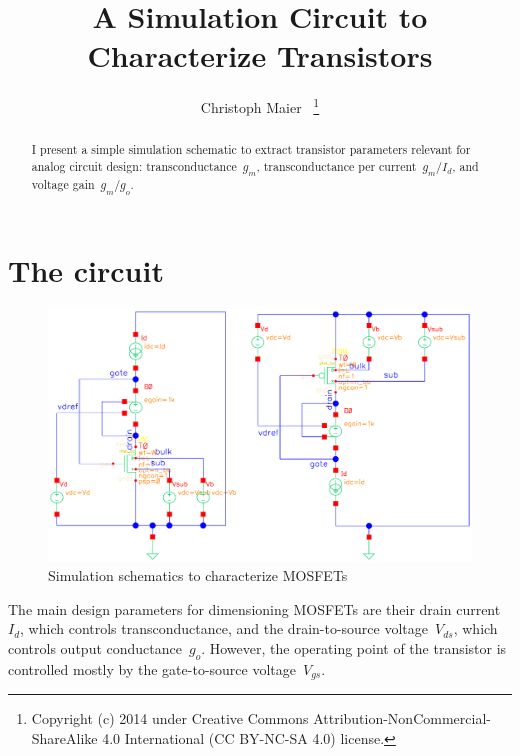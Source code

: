 \documentclass[journal]{IEEEtran}
\begin{document}
\title{A Simulation Circuit to Characterize Transistors}
\author{Christoph Maier~%
\thanks{Copyright (c) 2014 under Creative Commons
Attribution-NonCommercial-ShareAlike 4.0 International (CC BY-NC-SA 4.0) license.}}%
\maketitle
\begin{abstract}\boldmath
I present a simple simulation schematic to extract transistor parameters relevant for analog circuit design:
transconductance~$g_m$, transconductance per current~$g_m/I_d$, and voltage gain~$g_m/g_o$.
\end{abstract}



\IEEEpeerreviewmaketitle
\section{The circuit}
\begin{figure}[h]
\centering
\includegraphics[width=1.0\columnwidth]{figures/mostest_fb.pdf}
\caption{Simulation schematics to characterize MOSFETs}
\label{fig:schematics}
\end{figure}
%
The main design parameters for dimensioning MOSFETs are their drain current~$I_d$, 
which controls transconductance, 
and the drain-to-source voltage~$V_{ds}$, which controls output conductance~$g_o$.
However, the operating point of the transistor is controlled mostly by the gate-to-source voltage~$V_{gs}$.
\end{document}

